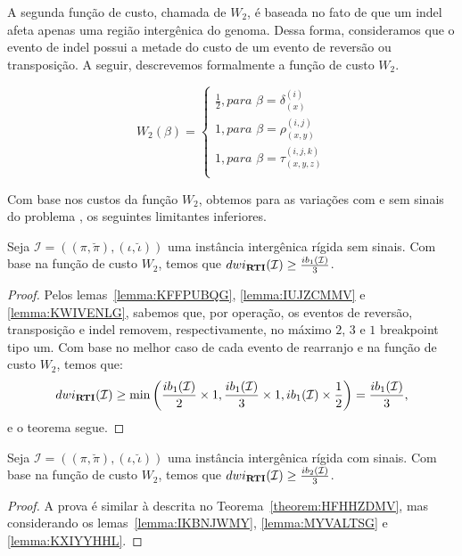 A segunda função de custo, chamada de $W_2$, é baseada no fato de que um indel afeta apenas uma região intergênica do genoma. Dessa forma, consideramos que o evento de indel possui a metade do custo de um evento de reversão ou transposição. A seguir, descrevemos formalmente a função de custo $W_2$.

$$
  W_2(\beta) = \begin{cases}
      \frac{1}{2}, \textit{para } \beta = \delta_{(x)}^{(i)} \\
      1, \textit{para } \beta = \rho_{(x,y)}^{(i,j)} \\
      1, \textit{para } \beta = \tau_{(x,y,z)}^{(i,j,k)} \\
  \end{cases}
$$

Com base nos custos da função $W_2$, obtemos para as variações com e sem sinais do problema \SbWIRTI{}, os seguintes limitantes inferiores.

\begin{theorem}\label{theorem:HFHHZDMV}
Seja $\mathcal{I} = ((\pi,\breve\pi),(\iota,\breve\iota))$ uma instância intergênica rígida sem sinais. Com base na função de custo $W_2$, temos que $dwi_{\textbf{RTI}}(\mathcal{I}) \ge \frac{ib_1(\mathcal{I})}{3}$.
\begin{proof}
Pelos lemas~\ref{lemma:KFFPUBQG}, \ref{lemma:IUJZCMMV} e \ref{lemma:KWIVENLG}, sabemos que, por operação, os eventos de reversão, transposição e indel removem, respectivamente, no máximo $2$, $3$ e $1$ breakpoint tipo um. Com base no melhor caso de cada evento de rearranjo e na função de custo $W_2$, temos que:
$$dwi_{\textbf{RTI}}(\mathcal{I}) \ge \min\left(\frac{ib_1(\mathcal{I})}{2} \times 1,\frac{ib_1(\mathcal{I})}{3} \times 1, ib_1(\mathcal{I}) \times \frac{1}{2}\right) = \frac{ib_1(\mathcal{I})}{3},$$ e o teorema segue.
\end{proof}
\end{theorem}

\begin{theorem}\label{theorem:IXYMBAWM}
Seja $\mathcal{I} = ((\pi,\breve\pi),(\iota,\breve\iota))$ uma instância intergênica rígida com sinais. Com base na função de custo $W_2$, temos que $dwi_{\textbf{RTI}}(\mathcal{I}) \ge \frac{ib_2(\mathcal{I})}{3}$.
\begin{proof}
A prova é similar à descrita no Teorema~\ref{theorem:HFHHZDMV}, mas considerando os lemas~\ref{lemma:IKBNJWMY}, \ref{lemma:MYVALTSG} e \ref{lemma:KXIYYHHL}.
\end{proof}
\end{theorem}

